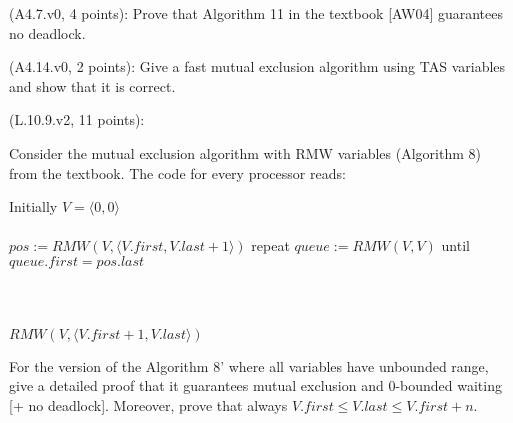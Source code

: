 \begin{Exc}{(A4.7.v0, 4 points):}
Prove that Algorithm 11 in the textbook [AW04] guarantees no deadlock.
\end{Exc}


\begin{Exc}{(A4.14.v0, 2 points):}
Give a fast mutual exclusion algorithm using TAS variables and
show that it is correct.
\end{Exc}


\begin{Exc}{(L.10.9.v2, 11 points):}
\newcommand{\last}[1]{#1.\mathit{last}}
\newcommand{\first}[1]{#1.\mathit{first}}
\newcommand{\VV}[1]{\langle #1 \rangle}
\newcommand{\pos}{\mathit{pos}}
\newcommand{\queue}{\mathit{queue}}
\newcommand{\RMW}{\mathit{RMW}}

Consider the mutual exclusion algorithm with RMW variables
(Algorithm 8) from the textbook. The code for every processor
reads:

\begin{code}%
\vspace*{-1cm}%
Initially $V=\VV{0,0}$\\
\\
\NL
\> $\pos := \RMW(V,\VV{\first{V},\last{V}+1})$\NL
\> repeat\NL
\>\> $\queue := \RMW(V,V)$\NL
\> until $\first{\queue} = \last{\pos}$\\
\\
\\
\\
\NL
\> $\RMW(V,\VV{\first{V}+1,\last{V}})$
\end{code}

For the version of the Algorithm 8' where all variables have unbounded
range, give a detailed proof that it guarantees mutual exclusion and
0-bounded waiting [+ no deadlock]. Moreover, prove that always
$\first{V} \leq \last{V} \leq \first{V}+n$.
\end{Exc}


